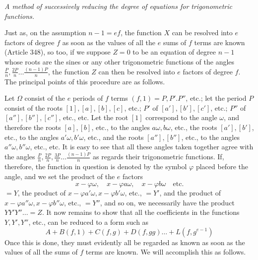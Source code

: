 \begin{center}\textit{A method of successively reducing the degree of equations for trigonometric functions.}\end{center}


Just as, on the assumption \(n-1=ef\), the function \(X\) can be resolved into \(e\) factors of degree \(f\) as soon as the values of all the \(e\) sums of \(f\) terms are known (Article 348), so too, if we suppose \(Z=0\) to be an equation of degree \(n-1\) whose roots are the sines or any other trigonometric functions of the angles \(\frac Pn,\allowbreak \frac{2P}n\ldots\frac{(n-1)P}n\), the function \(Z\) can then be resolved into \(e\) factors of degree \(f\). The principal points of this procedure are as follows.

Let \(\Omega\) consist of the \(e\) periods of \(f\) terms \((f,1)=P,\allowbreak P'.P''\), etc.; let the period \(P\) consist of the roots \([1],\allowbreak [a],\allowbreak [b],\allowbreak [c]\), etc.; \(P'\) of \([a'],\allowbreak [b'],\allowbreak [c']\), etc.; \(P''\) of \([a''],\allowbreak [b''],\allowbreak [c'']\), etc., etc. Let the root \([1]\) correspond to the angle \(\omega\), and therefore the roots \([a],\allowbreak [b]\), etc., to the angles \(a\omega,\allowbreak b\omega\), etc., the roots \([a'],\allowbreak [b']\), etc., to the angles \(a'\omega,\allowbreak b'\omega\), etc., and the roots \([a''],\allowbreak [b'']\), etc., to the angles \(a''\omega,\allowbreak b''\omega\), etc., etc. It is easy to see that all these angles taken together agree with the angles \(\frac Pn,\allowbreak \frac{2P}n,\allowbreak \frac{3P}n\ldots\frac{(n-1)P}n\) as regards their trigonometric functions. If, therefore, the function in question is denoted by the symbol \(\varphi\) placed before the angle, and we set the product of the \(e\) factors \[x-\varphi\omega,\quad x-\varphi a\omega,\quad x-\varphi b\omega\quad\text{etc.}\] \(=Y\), the product of \(x-\varphi a'\omega,\allowbreak x-\varphi b'\omega\), etc., \(=Y'\), and the product of \(x-\varphi a''\omega,\allowbreak x-\varphi b''\omega\), etc., \(=Y''\), and so on, we necessarily have the product \(YY'Y''\ldots=Z\). It now remains to show that all the coefficients in the functions \(Y,\allowbreak Y',\allowbreak Y''\), etc., can be reduced to a form such as
\[A+B(f,1)+C(f,g)+D(f,gg)\ldots+L(f,g^{e-1})\] Once this is done, they must evidently all be regarded as known as soon as the values of all the sums of \(f\) terms are known. We will accomplish this as follows.

